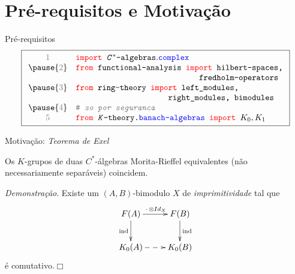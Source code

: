 \documentclass[9pt, compress]{beamer}
\begin{document}
{\section{Pré-requisitos e Motivação}
\begin{frame}{Pré-requisitos}
    \[\boxed{\begin{array}{cl}
       {\footnotesize \textcolor{gray}{1}} & \texttt{\textcolor{red}{import} \textit{C}$^*$-algebras}.\textcolor{blue}{\texttt{complex}} \\
       \pause
       {\footnotesize \textcolor{gray}{2}} &\texttt{\textcolor{red}{from} functional-analysis \textcolor{red}{import} hilbert-spaces,} \\
       & \hphantom{\texttt{\textcolor{red}{from} functional-analysis \textcolor{red}{imp}}}\texttt{fredholm-operators}\\ \pause

       {\footnotesize \textcolor{gray}{3}} & \texttt{\textcolor{red}{from} ring-theory \textcolor{red}{import} left\_modules,}\\ 
       & \hphantom{\texttt{\textcolor{red}{from} ring-theory \textcolor{red}{impo}}}\texttt{right\_modules, bimodules} \\\pause
       {\footnotesize \textcolor{gray}{4}} & \textcolor{gray}{\texttt{\# \textit{so por seguranca}}} \\
       {\footnotesize \textcolor{gray}{5}} & \texttt{\textcolor{red}{from} \textit{K}-theory.\textcolor{blue}{banach-algebras} \textcolor{red}{import} $K_0, K_1$} \\
        \end{array}}\]
\end{frame}

\begin{frame}[fragile]{Motivação: \textit{Teorema de Exel}}
    \begin{teorema}[Exel (1992)]
        Os $K$-grupos de duas $C^*$-álgebras Morita-Rieffel equivalentes (não necessariamente separáveis) coincidem.
    \end{teorema}

    \textit{Demonstração}. \pause 
    Existe um $(A,B)$-bimodulo $X$ de \textit{imprimitividade} tal que \pause
    $$
    \xymatrix{
    F(A) \ar[r]^{\,\cdot\, \otimes Id_X} \ar[d]_{\operatorname{ind}} & F(B) \ar[d]^{\operatorname{ind}}\\
    K_0(A) \ar@{-->}[r] & K_0(B)
    }$$
    é comutativo.\hfill $\Box$
\end{frame}

}
\end{document}
